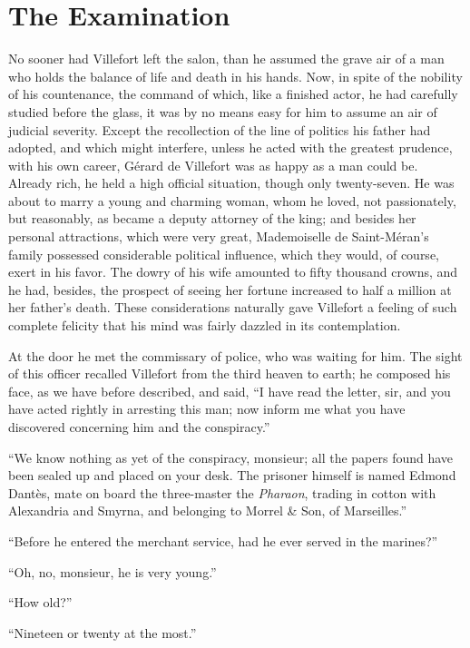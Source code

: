 \chapter{The Examination}

No sooner had Villefort left the salon, than he assumed the grave air
of a man who holds the balance of life and death in his hands. Now, in
spite of the nobility of his countenance, the command of which, like a
finished actor, he had carefully studied before the glass, it was by no
means easy for him to assume an air of judicial severity. Except the
recollection of the line of politics his father had adopted, and which
might interfere, unless he acted with the greatest prudence, with his
own career, Gérard de Villefort was as happy as a man could be. Already
rich, he held a high official situation, though only twenty-seven. He
was about to marry a young and charming woman, whom he loved, not
passionately, but reasonably, as became a deputy attorney of the king;
and besides her personal attractions, which were very great,
Mademoiselle de Saint-Méran’s family possessed considerable political
influence, which they would, of course, exert in his favor. The dowry
of his wife amounted to fifty thousand crowns, and he had, besides, the
prospect of seeing her fortune increased to half a million at her
father’s death. These considerations naturally gave Villefort a feeling
of such complete felicity that his mind was fairly dazzled in its
contemplation.

At the door he met the commissary of police, who was waiting for him.
The sight of this officer recalled Villefort from the third heaven to
earth; he composed his face, as we have before described, and said, “I
have read the letter, sir, and you have acted rightly in arresting this
man; now inform me what you have discovered concerning him and the
conspiracy.”

“We know nothing as yet of the conspiracy, monsieur; all the papers
found have been sealed up and placed on your desk. The prisoner himself
is named Edmond Dantès, mate on board the three-master the \textit{Pharaon},
trading in cotton with Alexandria and Smyrna, and belonging to Morrel \&
Son, of Marseilles.”

“Before he entered the merchant service, had he ever served in the
marines?”

“Oh, no, monsieur, he is very young.”

“How old?”

“Nineteen or twenty at the most.”

